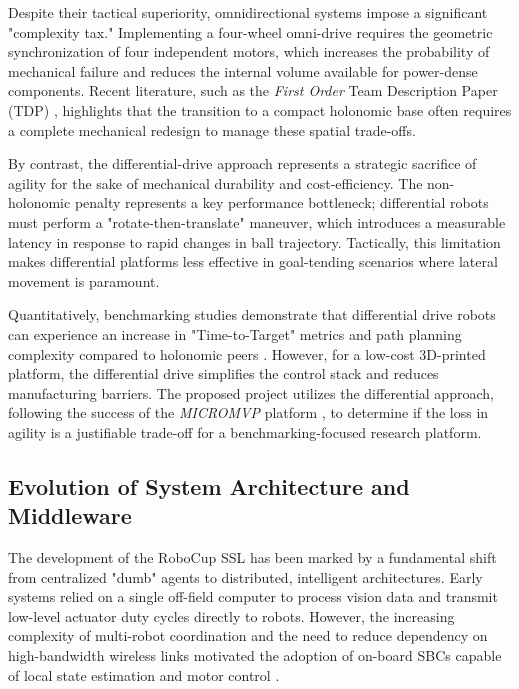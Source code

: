 \documentclass[a4paper,twoside,12pt]{report}
\begin{document}
Despite their tactical superiority, omnidirectional systems impose a significant "complexity tax." Implementing a four-wheel omni-drive requires the geometric synchronization of four independent motors, which increases the probability of mechanical failure and reduces the internal volume available for power-dense components. Recent literature, such as the \textit{First Order} Team Description Paper (TDP) \citep{liang2025first}, highlights that the transition to a compact holonomic base often requires a complete mechanical redesign to manage these spatial trade-offs.

By contrast, the differential-drive approach represents a strategic sacrifice of agility for the sake of mechanical durability and cost-efficiency. The non-holonomic penalty represents a key performance bottleneck; differential robots must perform a "rotate-then-translate" maneuver, which introduces a measurable latency in response to rapid changes in ball trajectory. Tactically, this limitation makes differential platforms less effective in goal-tending scenarios where lateral movement is paramount.

Quantitatively, benchmarking studies demonstrate that differential drive robots can experience an increase in "Time-to-Target" metrics and path planning complexity compared to holonomic peers \citep{chavan2015design}. However, for a low-cost 3D-printed platform, the differential drive simplifies the control stack and reduces manufacturing barriers. The proposed project utilizes the differential approach, following the success of the \textit{MICROMVP} platform \citep{yu2017portable}, to determine if the loss in agility is a justifiable trade-off for a benchmarking-focused research platform.

\subsection{Evolution of System Architecture and Middleware}

The development of the RoboCup SSL has been marked by a fundamental shift from centralized "dumb" agents to distributed, intelligent architectures. Early systems relied on a single off-field computer to process vision data and transmit low-level actuator duty cycles directly to robots. However, the increasing complexity of multi-robot coordination and the need to reduce dependency on high-bandwidth wireless links motivated the adoption of on-board SBCs capable of local state estimation and motor control \citep{smit2011development}.
\end{document}

